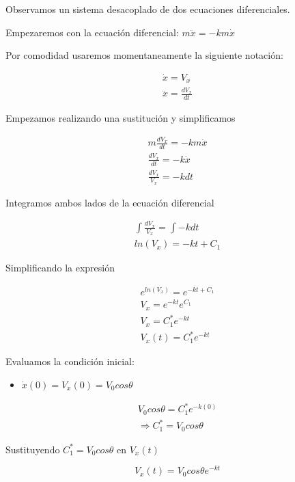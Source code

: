Observamos un sistema desacoplado de dos ecuaciones diferenciales.

\vspace*{5 mm}

Empezaremos con la ecuación diferencial: $ m\ddot{x} = -km\dot{x} $

\vspace*{5 mm}

Por comodidad usaremos momentaneamente la siguiente notación: 

\begin{gather*}
    \dot{x} = V_{x} \\
    \ddot{x} = \frac{dV_{x}}{dt}
\end{gather*}

Empezamos realizando una sustitución y simplificamos

\begin{gather*}
    m\frac{d V_{x}}{dt} = -km\dot{x} \\
    \frac{d V_{x}}{dt} = -k\dot{x} \\
    \frac{ d V_{x}}{V_{x}} = -kdt 
\end{gather*}

Integramos  ambos lados de la ecuación diferencial

\begin{gather*}
    \int \frac{ d V_{x}}{V_{x}} = \int -kdt \\
    ln(V_{x}) = -kt+C_{1}
\end{gather*}

Simplificando la expresión

\begin{gather*}
    e^{ln(V_{x})} = e^{-kt+C_{1}} \\
    V_{x} = e^{-kt} e^{C_{1}} \\
    V_{x} = C_{1}^{*}e^{-kt}  \\
    V_{x} (t) = C_{1}^{*}e^{-kt}
\end{gather*}

Evaluamos la condición inicial:

\begin{itemize}
    \item $\dot{x} (0) = V_{x} (0) = V_{0}cos \theta$
\end{itemize}

\begin{gather*}
    V_{0}cos \theta =  C_{1}^{*}e^{-k(0)} \\
    \Longrightarrow C_{1}^{*} = V_{0}cos \theta
\end{gather*}

Sustituyendo $C_{1}^{*} = V_{0}cos \theta$ en $V_{x} (t)$

\begin{equation*}
    V_{x} (t) = V_{0}cos \theta e^{-kt}
\end{equation*}
